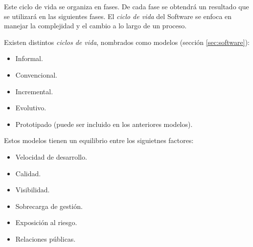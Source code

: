 Este ciclo de vida se organiza en fases. De cada fase se obtendrá un
resultado que se utilizará en las siguientes fases. El \emph{ciclo de
  vida} del Software se enfoca en manejar la complejidad y el cambio
a lo largo de un proceso.

Existen distintos \emph{ciclos de vida}, nombrados como modelos
(sección \ref{sec:software}):
\begin{itemize}[noitemsep]
\item Informal.
\item Convencional.
\item Incremental.
\item Evolutivo.
\item Prototipado (puede ser incluido en los anteriores modelos).
\end{itemize}

Estos modelos tienen un equilibrio entre los siguietnes factores:
\begin{itemize}[noitemsep]
\item Velocidad de desarrollo.
\item Calidad.
\item Visibilidad.
\item Sobrecarga de gestión.
\item Exposición al riesgo.
\item Relaciones públicas.
\end{itemize}